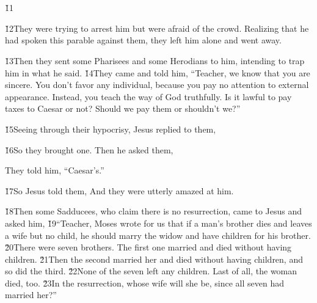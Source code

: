 \begin{poetry}
\poeml {} \\
\poemll    {} \\
\poeml \v{11} \\
\poemll    {}
\end{poetry}

\v{12}They were trying to arrest him but were afraid of the crowd. Realizing that he had spoken this parable against them, they left him alone and went away.

\v{13}Then they sent some Pharisees and some Herodians to him, intending to trap him in what he said. \v{14}They came and told him, ``Teacher, we know that you are sincere. You don't favor any individual, because you pay no attention to external appearance. Instead, you teach the way of God truthfully. Is it lawful to pay taxes to Caesar or not? Should we pay them or shouldn't we?''

\v{15}Seeing through their hypocrisy, Jesus replied to them, 

\v{16}So they brought one. Then he asked them, 

They told him, ``Caesar's.''

\v{17}So Jesus told them,  And they were utterly amazed at him.

\v{18}Then some Sadducees, who claim there is no resurrection, came to Jesus and asked him, \v{19}``Teacher, Moses wrote for us that if a man's brother dies and leaves a wife but no child, he should marry the widow and have children for his brother. \v{20}There were seven brothers. The first one married and died without having children. \v{21}Then the second married her and died without having children, and so did the third. \v{22}None of the seven left any children. Last of all, the woman died, too. \v{23}In the resurrection, whose wife will she be, since all seven had married her?''

